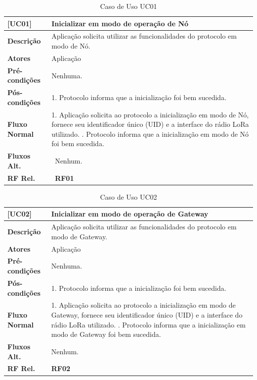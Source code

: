 \begin{longtable}{|p{2.65cm}|p{13cm}|}
    \caption{Caso de Uso UC01}\label{tab:use-cases01} \\
    \hline
    \textbf{[UC01]} & Inicializar em modo de operação de Nó \\
    \hline
    \textbf{Descrição} & Aplicação solicita utilizar as funcionalidades do protocolo em modo de Nó. \\
    \hline
    \textbf{Atores} & Aplicação \\
    \hline
    \textbf{Pré-condições} & Nenhuma. \\
    \hline
    \textbf{Pós-condições} & 1. Protocolo informa que a inicialização foi bem sucedida. \\
    \hline
    \textbf{Fluxo Normal} & 1. Aplicação solicita ao protocolo a inicialização em modo de Nó, fornece seu 
    identificador único (UID) e a interface do rádio LoRa utilizado. \newline
    2. Protocolo informa que a inicialização em modo de Nó foi bem sucedida. \\
    \hline
    \textbf{Fluxos Alt.} & \
    Nenhum. \\
    \hline
    \textbf{RF Rel.} & \
    \textbf{RF01} \\
    \hline
\end{longtable}

\begin{longtable}{|p{2.65cm}|p{13cm}|}
    \caption{Caso de Uso UC02}\label{tab:use-cases02} \\
    \hline
    \textbf{[UC02]} & Inicializar em modo de operação de Gateway \\
    \hline
    \textbf{Descrição} & Aplicação solicita utilizar as funcionalidades do protocolo em modo de Gateway. \\
    \hline
    \textbf{Atores} & Aplicação \\
    \hline
    \textbf{Pré-condições} & Nenhuma. \\
    \hline
    \textbf{Pós-condições} & 1. Protocolo informa que a inicialização foi bem sucedida. \\
    \hline
    \textbf{Fluxo Normal} & 1. Aplicação solicita ao protocolo a inicialização em modo de Gateway, fornece seu identificador único (UID) e a interface do rádio LoRa utilizado. \newline
    2. Protocolo informa que a inicialização em modo de Gateway foi bem sucedida. \\
    \hline
    \textbf{Fluxos Alt.} & Nenhum. \\
    \hline
    \textbf{RF Rel.} & \textbf{RF02} \\
    \hline
\end{longtable}

